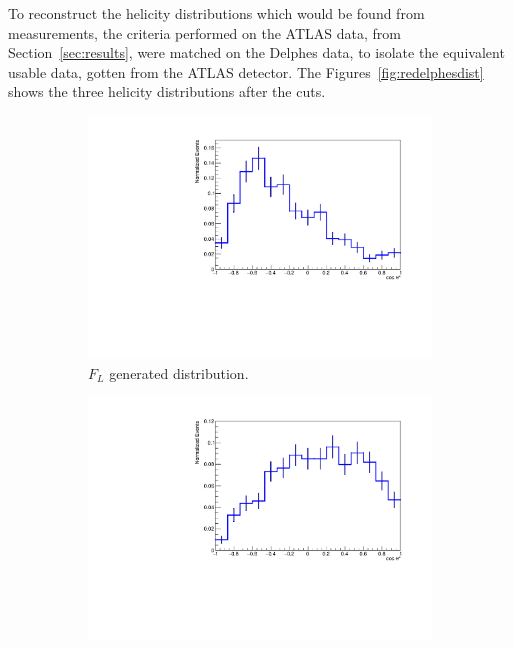 \documentclass[12pt,a4paper]{article}
\numberwithin{equation}{section}
\begin{document}
To reconstruct the helicity distributions which would be found from
measurements, the criteria performed on the ATLAS data, from
Section~\ref{sec:results}, were matched on the Delphes data, to isolate the
equivalent usable data, gotten from the ATLAS detector. The
Figures~\ref{fig:redelphesdist} shows the three helicity distributions after the
cuts.
\begin{figure}[t!]
  \centering
  \begin{subfigure}[t]{0.5\textwidth}
    \centering
    \includegraphics[width=1.0\textwidth]{figures/delphes_ctstarL}
    \caption{$F_L$ generated distribution.}
  \end{subfigure}%
  \begin{subfigure}[t]{0.5\textwidth}
    \centering
    \includegraphics[width=1.0\textwidth]{figures/delphes_ctstarR}

\end{subfigure}
\end{figure}
\end{document}
